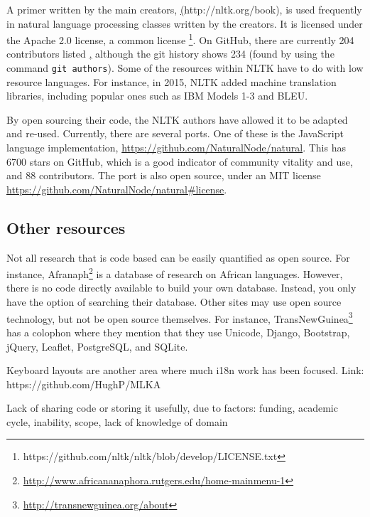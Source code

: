 A primer written by the main creators, \href{Natural Language Processing with Python}(http://nltk.org/book), is used frequently in natural language processing classes written by the creators. It is licensed under the Apache 2.0 license, a common license \footnote{https://github.com/nltk/nltk/blob/develop/LICENSE.txt}. On GitHub, there are currently 204 contributors listed \href{https://github.com/nltk/nltk/graphs/contributors}, although the git history shows 234 (found by using the command {\tt git authors}).%
Some of the resources within NLTK have to do with low resource languages. For instance, in 2015, NLTK added machine translation libraries, including popular ones such as IBM Models 1-3 and BLEU.

By open sourcing their code, the NLTK authors have allowed it to be adapted and re-used. Currently, there are several ports. %
One of these is the JavaScript language implementation, \href{https://github.com/NaturalNode/natural}{https://github.com/NaturalNode/natural}. This has 6700 stars on GitHub, which is a good indicator of community vitality and use, and 88 contributors. The port is also open source, under an MIT license \href{https://github.com/NaturalNode/natural\#license}{https://github.com/NaturalNode/natural\#license}.

\subsection{Other resources}

Not all research that is code based can be easily quantified as open source. For instance, Afranaph\footnote{\href{http://www.africananaphora.rutgers.edu/home-mainmenu-1}{http://www.africananaphora.rutgers.edu/home-mainmenu-1}} is a database of research on African languages. However, there is no code directly available to build your own database. Instead, you only have the option of searching their database. Other sites may use open source technology, but not be open source themselves. For instance, TransNewGuinea\footnote{\href{http://transnewguinea.org/about}{http://transnewguinea.org/about}} has a colophon where they mention that they use Unicode, Django, Bootstrap, jQuery, Leaflet, PostgreSQL, and SQLite.

Keyboard layouts are another area where much i18n work has been focused. Link: https://github.com/HughP/MLKA

Lack of sharing code or storing it usefully, due to factors: funding, academic cycle, inability, scope, lack of knowledge of domain

